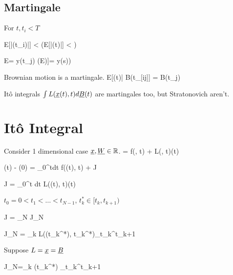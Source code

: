 \subsection{Martingale}

For $t, t_i < T$

\beq
E[\;|\rvy(t_i)|\;] < \infty \quad
(E[\;|\rvy(t)|\;] < \infty) 
\eeq


\beq
E= y(t_j)
\quad (E\left[\rvy(t)|x([0,s])\right]= y(s))
\eeq


Brownian motion is a martingale.
\beq
E[\rvB(t)| B(t_{[i\upto j]}] = B(t_j)
\eeq


It\^{o} integrals $\int L({\underline{x}}(t), t)d{\underline{B}}(t)$
are martingales too, but Stratonovich
aren't. 



\section{It\^{o} Integral}

Consider 1 dimensional case ${\underline{x}}, {\underline{W}}\in { \mathbb{R}}$.
\beq
{}= f(\rvx, t) + L(\rvx, t)\rvW(t)
\eeq

\beq
\rvx(t) - \rvx(0) =
\int_{0}^{t}dt\; f(\rvx(t), t) + J
\eeq

\beq
J = \int_{0}^t dt\;
L(\rvx(t), t)\rvW(t)
\eeq

$t_0=0 < t_1 <\ldots <t_{N-1}$, $t_k^*\in [t_k, t_{k+1})$

\beq 
J = \lim_{N\rarrow \infty} J_N
\eeq


\beq 
J_N = 
\sum_k L(\rvx(t_k^*), t_k^*)\Delta_{t_k}^{t_{k+1}}\rvB
\eeq


Suppose $L={\underline{x}}={\underline{B}}$

\beq
J_N=\sum_k \rvB(t_k^*) \Delta_{t_k}^{t_{k+1}}\rvB
\eeq

